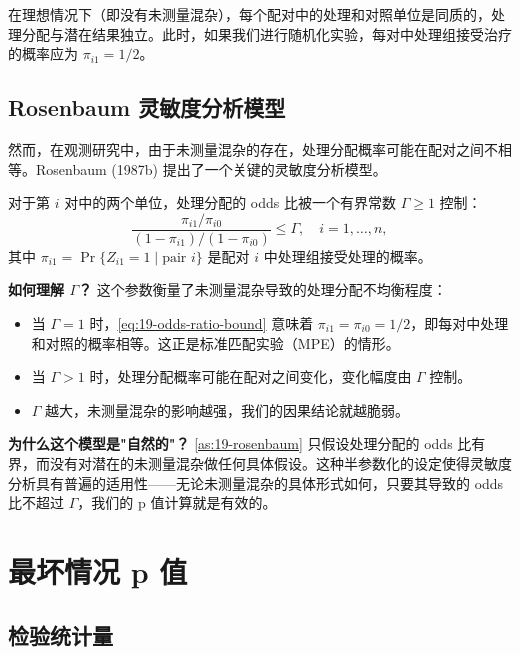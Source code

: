 在理想情况下（即没有未测量混杂），每个配对中的处理和对照单位是同质的，处理分配与潜在结果独立。此时，如果我们进行随机化实验，每对中处理组接受治疗的概率应为 $\pi_{i1} = 1/2$。

\subsection{Rosenbaum 灵敏度分析模型}\label{sec:19-assumption}

然而，在观测研究中，由于未测量混杂的存在，处理分配概率可能在配对之间不相等。Rosenbaum (1987b) 提出了一个关键的灵敏度分析模型。

\begin{Assumption}\label{as:19-rosenbaum}
对于第 $i$ 对中的两个单位，处理分配的 odds 比被一个有界常数 $\Gamma \geq 1$ 控制：
\[
\frac{\pi_{i1}/\pi_{i0}}{(1-\pi_{i1})/(1-\pi_{i0})} \leq \Gamma, \quad i=1,\ldots,n,
\label{eq:19-odds-ratio-bound}
\]
其中 $\pi_{i1} = \Pr\{Z_{i1}=1 \mid \text{pair } i\}$ 是配对 $i$ 中处理组接受处理的概率。
\end{Assumption}

\textbf{如何理解 $\Gamma$？} 这个参数衡量了未测量混杂导致的处理分配不均衡程度：

\begin{itemize}
  \item 当 $\Gamma = 1$ 时，\cref{eq:19-odds-ratio-bound} 意味着 $\pi_{i1} = \pi_{i0} = 1/2$，即每对中处理和对照的概率相等。这正是标准匹配实验（MPE）的情形。
  \item 当 $\Gamma > 1$ 时，处理分配概率可能在配对之间变化，变化幅度由 $\Gamma$ 控制。
  \item $\Gamma$ 越大，未测量混杂的影响越强，我们的因果结论就越脆弱。
\end{itemize}

\textbf{为什么这个模型是"自然的"？} \cref{as:19-rosenbaum} 只假设处理分配的 odds 比有界，而没有对潜在的未测量混杂做任何具体假设。这种半参数化的设定使得灵敏度分析具有普遍的适用性——无论未测量混杂的具体形式如何，只要其导致的 odds 比不超过 $\Gamma$，我们的 p 值计算就是有效的。

\section{最坏情况 p 值}\label{sec:19-worst-case}

\subsection{检验统计量}\label{sec:19-test-stat}


